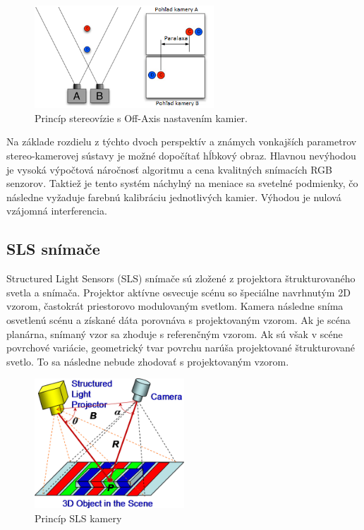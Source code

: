 \begin{figure}[h]
	\centering
	\includegraphics[width=0.6\textwidth]{figures/stereovizia.png} 
	\caption{Princíp stereovízie s Off-Axis nastavením kamier.}
	\label{fig:stereovizia}
\end{figure}

Na základe rozdielu z týchto dvoch perspektív a známych vonkajších parametrov stereo-kamerovej sústavy je možné dopočítať hĺbkový obraz. Hlavnou nevýhodou je vysoká výpočtová náročnosť algoritmu a cena kvalitných snímacích RGB senzorov. Taktiež je tento systém náchylný na meniace sa svetelné podmienky, čo následne vyžaduje farebnú kalibráciu jednotlivých kamier. Výhodou je nulová vzájomná interferencia.

\subsection{SLS snímače}
\label{sec:sls}
Structured Light Sensors (SLS) snímače sú zložené z projektora štrukturovaného svetla a snímača. Projektor aktívne osvecuje scénu so špeciálne navrhnutým 2D vzorom, častokrát priestorovo modulovaným svetlom. Kamera následne sníma osvetlenú scénu a získané dáta porovnáva s projektovaným vzorom. Ak je scéna planárna, snímaný vzor sa zhoduje s referenčným vzorom. Ak sú však v scéne povrchové variácie, geometrický tvar povrchu narúša projektované štrukturované svetlo. To sa následne nebude zhodovať s projektovaným vzorom.

\begin{figure}[H]
	\centering
	\includegraphics[width=0.5\textwidth]{figures/SLS.jpeg} 
	\caption{Princíp SLS kamery}
	\label{fig:sls}
\end{figure}

